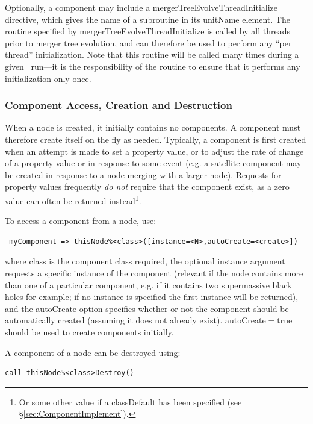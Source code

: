 Optionally, a component may include a {\normalfont \ttfamily mergerTreeEvolveThreadInitialize} directive, which gives the name of a subroutine in its {\normalfont \ttfamily unitName} element. The routine specified by {\normalfont \ttfamily mergerTreeEvolveThreadInitialize} is called by all threads prior to merger tree evolution, and can therefore be used to perform any ``per thread'' initialization. Note that this routine will be called many times during a given \glc\ run---it is the responsibility of the routine to ensure that it performs any initialization only once.

\subsubsection{Component Access, Creation and Destruction}

When a node is created, it initially contains no components. A component must therefore create itself on the fly as needed. Typically, a component is first created when an attempt is made to set a property value, or to adjust the rate of change of a property value or in response to some event (e.g. a satellite component may be created in response to a node merging with a larger node). Requests for property values frequently \emph{do not} require that the component exist, as a zero value can often be returned instead\footnote{Or some other value if a {\normalfont \ttfamily classDefault} has been specified (see \S\ref{sec:ComponentImplement}).}.

To access a component from a node, use:
\begin{verbatim}
 myComponent => thisNode%<class>([instance=<N>,autoCreate=<create>])
\end{verbatim}
where {\normalfont \ttfamily class} is the component class required, the optional {\normalfont \ttfamily instance} argument requests a specific instance of the component (relevant if the node contains more than one of a particular component, e.g. if it contains two supermassive black holes for example; if no {\normalfont \ttfamily instance} is specified the first instance will be returned), and the {\normalfont \ttfamily autoCreate} option specifies whether or not the component should be automatically created (assuming it does not already exist). {\normalfont \ttfamily autoCreate}$=${\normalfont \ttfamily true} should be used to create components initially.

A component of a node can be destroyed using:
\begin{verbatim}
call thisNode%<class>Destroy()
\end{verbatim}

